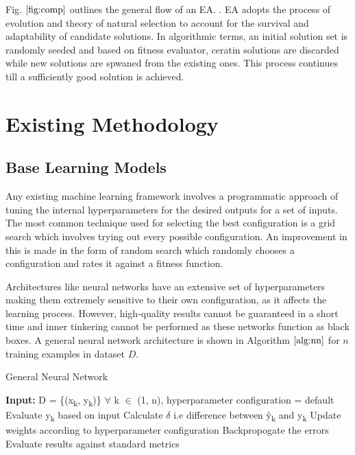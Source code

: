 \documentclass[conference]{IEEEtran}
\theoremstyle{definition}
\begin{document}
Fig. $\ref{fig:comp}$ outlines the general flow of an EA. \cite{fried}. EA adopts the process of evolution and theory of natural selection to account for the survival and adaptability of candidate solutions. In algorithmic terms, an initial solution set is randomly seeded and based on fitness evaluator, ceratin solutions are discarded while new solutions are spwaned from the existing ones. This process continues till a sufficiently good solution is achieved. 



\section{Existing Methodology}

\subsection{Base Learning Models}
Any existing machine learning framework involves a programmatic approach of tuning the internal hyperparameters for the desired outputs for a set of inputs. The most common technique used for selecting the best configuration is a grid search which involves trying out every possible configuration. An improvement in this is made in the form of random search which randomly chooses a configuration and rates it against a fitness function. 

Architectures like neural networks have an extensive set of hyperparameters making them extremely sensitive to their own configuration, as it affects the learning process. However, high-quality results cannot be guaranteed in a short time and inner tinkering cannot be performed as these networks function as black boxes. A general neural network architecture is shown in Algorithm $\ref{alg:nn}$ for $\textit{n}$ training examples in dataset $\textit{D}$. 

\begin{algorithm}[b]
\scriptsize
\caption{General Neural Network}
\label{alg:nn}
\begin{algorithmic}[1]
\STATE \textbf{Input:} D = \{(x\textsubscript{k}, y\textsubscript{k})\} $\forall$ k $\in$ (1, n), hyperparameter configuration = default
\STATE Evaluate y\textsubscript{k} based on input
\STATE Calculate $\delta$ i.e difference between \^y\textsubscript{k} and y\textsubscript{k}
\STATE Update weights according to hyperparameter configuration
\STATE Backpropogate the errors
\STATE Evaluate results against standard metrics
\ENDWHILE
\end{algorithmic}
\end{algorithm}
\end{document}
